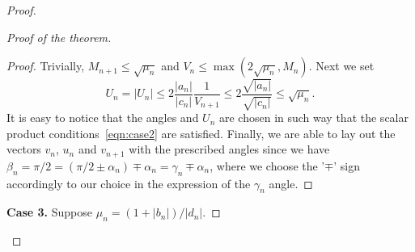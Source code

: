 \begin{proof}
\begin{proof}[Proof of the theorem]
\begin{proof}
            Trivially, $M_{n+1} \leq \sqrt{\mu_n}$ and $V_n \leq \max(2\sqrt{\mu_n}, M_n)$.
            Next we set
            \[
              U_n = |U_n| \leq 2 \frac{|a_n|}{|c_n|} \frac{1}{V_{n+1}} \leq 2 \frac{\sqrt{|a_n|}}{\sqrt{|c_n|}} \leq \sqrt{\mu_n}.
            \]
            It is easy to notice that the angles and $U_n$ are chosen in such way that the scalar product conditions~\eqref{eqn:case2} are satisfied.
            Finally, we are able to lay out the vectors $v_n$, $u_n$ and $v_{n+1}$ with the prescribed angles
              since we have $\beta_n = \pi/2 = (\pi/2 \pm \alpha_n) \mp \alpha_n = \gamma_n \mp \alpha_n$,
              where we choose the '$\mp$' sign accordingly to our choice in the expression of the $\gamma_n$ angle.
          \end{proof}
        \noindent\textbf{Case 3.} Suppose $\mu_n = (1 + |b_n|)/|d_n|$.


\end{proof}
\end{proof}
